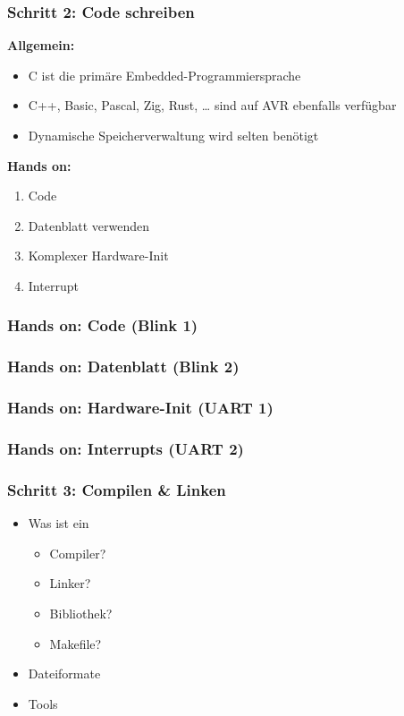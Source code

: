 \documentclass{beamer}
\begin{document}
\begin{frame}
\frametitle{Schritt 2: Code schreiben}

\textbf{Allgemein:}
\begin{itemize}
\item C ist die primäre Embedded-Programmiersprache
\item C++, Basic, Pascal, Zig, Rust, … sind auf AVR ebenfalls verfügbar
\item Dynamische Speicherverwaltung wird selten benötigt
\end{itemize}

\textbf{Hands on:}
\begin{enumerate}
\item Code
\item Datenblatt verwenden
\item Komplexer Hardware-Init
\item Interrupt
\end{enumerate}
\end{frame}

\begin{frame}
\frametitle{Hands on: Code (Blink 1)}

\end{frame}

\begin{frame}
\frametitle{Hands on: Datenblatt (Blink 2)}

\end{frame}

\begin{frame}
\frametitle{Hands on: Hardware-Init (UART 1)}

\end{frame}

\begin{frame}
\frametitle{Hands on: Interrupts (UART 2)}

\end{frame}

\begin{frame}
\frametitle{Schritt 3: Compilen \& Linken}
\begin{itemize}
\item Was ist ein
    \begin{itemize}
    \item Compiler?
    \item Linker?
    \item Bibliothek?
    \item Makefile?
    \end{itemize}
\item Dateiformate
\item Tools
\end{itemize}
\end{frame}
\end{document}
